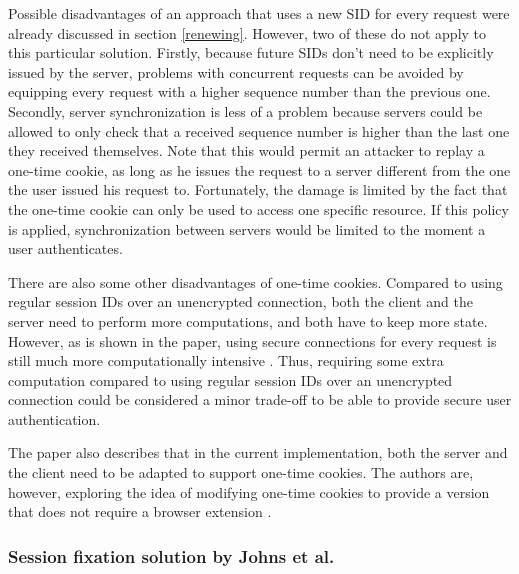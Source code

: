 Possible disadvantages of an approach that uses a new SID for every request were already discussed in section \ref{renewing}. However, two of these do not apply to this particular solution. Firstly, because future SIDs don't need to be explicitly issued by the server, problems with concurrent requests can be avoided by equipping every request with a higher sequence number than the previous one. Secondly, server synchronization is less of a problem because servers could be allowed to only check that a received sequence number is higher than the last one they received themselves. Note that this would permit an attacker to replay a one-time cookie, as long as he issues the request to a server different from the one the user issued his request to. Fortunately, the damage is limited by the fact that the one-time cookie can only be used to access one specific resource. If this policy is applied, synchronization between servers would be limited to the moment a user authenticates.

There are also some other disadvantages of one-time cookies. Compared to using regular session IDs over an unencrypted connection, both the client and the server need to perform more computations, and both have to keep more state. However, as is shown in the paper, using secure connections for every request is still much more computationally intensive \cite{Dacosta2011}. Thus, requiring some extra computation compared to using regular session IDs over an unencrypted connection could be considered a minor trade-off to be able to provide secure user authentication.

The paper also describes that in the current implementation, both the server and the client need to be adapted to support one-time cookies. The authors are, however, exploring the idea of modifying one-time cookies to provide a version that does not require a browser extension \cite{Dacosta2011}.

\subsubsection{Session fixation solution by Johns et al.}

